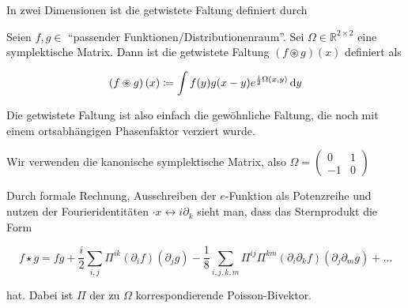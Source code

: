 In zwei Dimensionen ist die getwistete Faltung definiert durch

\begin{definition}
\label{def:twisted_convolution}
    Seien $f,g \in $ "`passender Funktionen/Distributionenraum"'. Sei $\Omega \in \mathbb{R}^{2 \times 2}$ eine symplektische Matrix. Dann ist die getwistete Faltung $(f \circledast g) (x)$ definiert als

    \begin{equation}
        (f \circledast g) \,(x) \coloneqq
        \int f(y) g(x-y)e^{\frac{i}{2} \Omega(x,y)} \mathop{}\!\mathrm{d} y
    \end{equation}

    Die getwistete Faltung ist also einfach die gewöhnliche Faltung, die noch mit einem ortsabhängigen Phasenfaktor verziert wurde.

    Wir verwenden die kanonische symplektische Matrix, also
    $\Omega = \left(\begin{smallmatrix}
        0 & 1 \\ -1 & 0
    \end{smallmatrix}\right)$
\end{definition}

Durch formale Rechnung, Ausschreiben der $e$-Funktion als Potenzreihe und nutzen der Fourieridentitäten $\cdot x \leftrightarrow i \partial_k$ sieht man, dass das Sternprodukt die Form

\begin{equation*}
    f \star g = fg + \frac{i}{2} \sum_{i,j} \Pi^{ik}(\partial_if)(\partial_jg) - \frac{1}{8}\sum_{i,j,k,m} \Pi^{ij} \Pi^{km} (\partial_i \partial_k f)(\partial_j \partial_m g) + \dots
\end{equation*}

hat. Dabei ist $\Pi$ der zu $\Omega$ korrespondierende Poisson-Bivektor.


